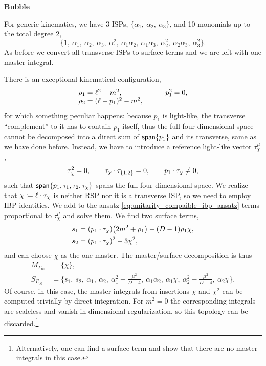 \textbf{Bubble}

For generic kinematics, we have 3 ISPs, $\{\alpha_1,~\alpha_2,~\alpha_3\}$, and
10 monomials up to the total degree 2,
\[
  \{1,~\alpha_1,~\alpha_2,~\alpha_3,~\alpha_1^2,~\alpha_1\alpha_2,~\alpha_1\alpha_3,~\alpha_2^2,~\alpha_2\alpha_3,~ \alpha_3^2\}.
\]
As before we convert all transverse ISPs to surface terms and we are left with one master integral.

There is an exceptional kinematical configuration,
\begin{equation*}
  \begin{tabular}{ll}
    $\rho_1 = \ell^2-m^2$,               &  \qquad $p_1^2=0$,\\
    $\rho_2 = (\ell-p_1)^2-m^2$,         &  \\
  \end{tabular}
\end{equation*}
for which something peculiar happens:
because $p_1$ is light-like, the transverse ``complement'' to it has to contain $p_1$ itself, thus the full four-dimensional space
cannot be decomposed into a direct sum of $\mathsf{span}\{p_1\}$ and its transverse, same as we have done before.
Instead, we have to introduce a reference light-like vector $\tau_\chi^\mu$,
\[
  \tau_\chi^2=0, \qquad \sp(\tau_\chi,\tau_{\{1,2\}}) = 0, \qquad  \sp(p_1,\tau_\chi) \neq 0,
\]
such that $\mathsf{span}\{p_1,\tau_1,\tau_2,\tau_\chi\}$ spans the full four-dimensional space.
We realize that $\chi \coloneqq \sp(\ell,\tau_\chi)$ is neither RSP nor it is a transverse ISP, so 
we need to employ IBP identities.
We add to the ansatz \eqref{eq:unitarity_compaible_ibp_ansatz} terms proportional to $\tau_\chi^\mu$ and solve them.
We find two surface terms,
\begin{align*}
  s_1 &= (\sp(p_1,\tau_\chi)) \qty(2 m^2 + \rho_1) - (D-1)\rho_1\chi, \\
  s_2 &= (\sp(p_1,\tau_\chi))^2 - 3 \chi^2,
\end{align*}
and can choose $\chi$ as the one master. The master/surface decomposition is thus
\begin{align*}
  M_{\Gamma_\text{b0} } &= \{\chi\}, \\
   S_{\Gamma_\text{b0} } &= 
  \{s_1,~s_2,~\alpha_1,~\alpha_2,~\alpha_1^2 - \frac{\mu^2}{D-4},~\alpha_1\alpha_2,~ \alpha_1\chi,~\alpha_2^2-\frac{\mu^2}{D-4},~\alpha_2\chi \}.
\end{align*}
Of course, in this case, the master integrals from insertions $\chi$ and $\chi^2$ can be computed trivially by direct integration.
For $m^2=0$ the corresponding integrals are scaleless and vanish in dimensional regularization,
so this topology can be discarded.\footnote{
  Alternatively, one can find a surface term and show that there are no master integrals in this case.
}

